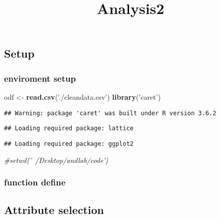 \documentclass[]{article}
\title{Analysis2}
\author{}
\date{\vspace{-2.5em}}
\newenvironment{Shaded}{\begin{snugshade}}{\end{snugshade}}
\newcommand{\CommentTok}[1]{\textcolor[rgb]{0.56,0.35,0.01}{\textit{#1}}}
\newcommand{\KeywordTok}[1]{\textcolor[rgb]{0.13,0.29,0.53}{\textbf{#1}}}
\newcommand{\NormalTok}[1]{#1}
\newcommand{\StringTok}[1]{\textcolor[rgb]{0.31,0.60,0.02}{#1}}
\begin{document}
\maketitle

\hypertarget{setup}{%
\subsection{Setup}\label{setup}}

\hypertarget{enviroment-setup}{%
\subsubsection{enviroment setup}\label{enviroment-setup}}

\begin{Shaded}
\begin{Highlighting}[]
\NormalTok{odf <-}\StringTok{ }\KeywordTok{read.csv}\NormalTok{(}\StringTok{'./cleandata.csv'}\NormalTok{)}
\KeywordTok{library}\NormalTok{(}\StringTok{'caret'}\NormalTok{)}
\end{Highlighting}
\end{Shaded}

\begin{verbatim}
## Warning: package 'caret' was built under R version 3.6.2
\end{verbatim}

\begin{verbatim}
## Loading required package: lattice
\end{verbatim}

\begin{verbatim}
## Loading required package: ggplot2
\end{verbatim}

\begin{Shaded}
\begin{Highlighting}[]
\CommentTok{#setwd('~/Desktop/andlab/code')}
\end{Highlighting}
\end{Shaded}

\hypertarget{function-define}{%
\subsubsection{function define}\label{function-define}}

\hypertarget{attribute-selection}{%
\subsection{Attribute selection}\label{attribute-selection}}
\end{document}
